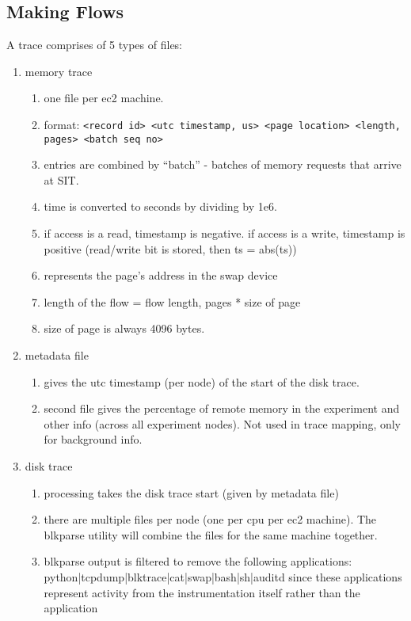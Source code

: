 \subsection{Making Flows}
A trace comprises of 5 types of files:
\begin{enumerate}
\item memory trace
    \begin{enumerate}
    \item one file per ec2 machine.
    \item format: \texttt{<record id> <utc timestamp, us> <page location> <length, pages> <batch seq no>}
    \item entries are combined by ``batch'' - batches of memory requests that arrive at SIT.
    \item time is converted to seconds by dividing by 1e6.
    \item if access is a read, timestamp is negative. if access is a write, timestamp is positive (read/write bit is stored, then ts = abs(ts))
    \item <page location> represents the page's address in the swap device
    \item length of the flow = flow length, pages * size of page
    \item size of page is always 4096 bytes.
    \end{enumerate}
\item metadata file
    \begin{enumerate}
    \item gives the utc timestamp (per node) of the start of the disk trace.
    \item second file gives the percentage of remote memory in the experiment and other info (across all experiment nodes). Not used in trace mapping, only for background info.
    \end{enumerate}
\item disk trace
    \begin{enumerate}
    \item processing takes the disk trace start (given by metadata file)
    \item there are multiple files per node (one per cpu per ec2 machine). The blkparse utility will combine the files for the same machine together.
    \item blkparse output is filtered to remove the following applications: python|tcpdump|blktrace|cat|swap|bash|sh|auditd since these applications represent activity from the instrumentation itself rather than the application

\end{enumerate}
\end{enumerate}
